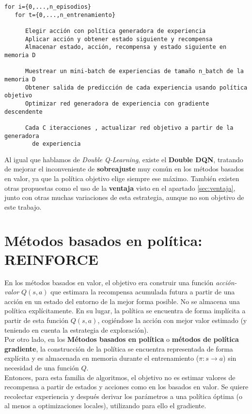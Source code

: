 \documentclass[11pt,fleqn]{book} %
\begin{document}
\begin{verbatim}
for i={0,...,n_episodios}
   for t={0,...,n_entrenamiento}

      Elegir acción con política generadora de experiencia
      Aplicar acción y obtener estado siguiente y recompensa
      Almacenar estado, acción, recompensa y estado siguiente en memoria D

      Muestrear un mini-batch de experiencias de tamaño n_batch de la memoria D
      Obtener salida de predicción de cada experiencia usando política objetivo
      Optimizar red generadora de experiencia con gradiente descendente

      Cada C iteracciones , actualizar red objetivo a partir de la generadora
        de experiencia
\end{verbatim}

Al igual que hablamos de \textit{Double Q-Learning}, existe el \textbf{Double DQN}, tratando de mejorar el inconveniente de \textbf{sobreajuste} muy común en los métodos basados en valor, ya que la política objetivo elige siempre ese máximo. También existen otras propuestas como el uso de la \textbf{ventaja} visto en el apartado \ref{sec:ventaja}, junto con otras muchas variaciones de esta estrategia, aunque no son objetivo de este trabajo.

\section{Métodos basados en política: REINFORCE}

En los métodos basados en valor, el objetivo era construir una función \textit{acción-valor} $Q(s,a)$ que estimara la recompensa acumulada futura a partir de una acción en un estado del entorno de la mejor forma posible. No se almacena una política explícitamente. En su lugar, la política se encuentra de forma implícita a partir de esta función $Q(s,a)$, cogiéndose la acción con mejor valor estimado (y teniendo en cuenta la estrategia de exploración). \\

Por otro lado, en los \textbf{Métodos basados en política} o \textbf{métodos de política gradiente}, la construcción de la política se encuentra representada de forma explícita y es almacenada en memoria durante el entrenamiento ($\pi: s \rightarrow a$) sin necesidad de una función $Q$. \\

Entonces, para esta familia de algoritmos, el objetivo no es estimar valores de recompensa a partir de estados y acciones como en los basados en valor. Se quiere recolectar experiencia y después derivar los parámetros a una política óptima (o al menos a optimizaciones locales), utilizando para ello el gradiente.
\end{document}
